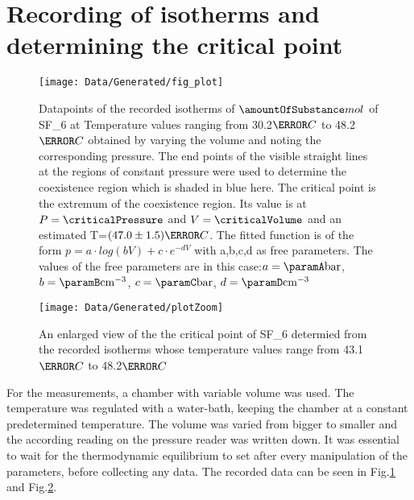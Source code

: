 \documentclass[a4paper,10pt,twocolumn]{article}
\begin{document}
    \section{Recording of isotherms and determining the critical point}
    \label{sec:Measurement}
    \begin{figure}
        \begin{center}
            \texttt{[image: Data/Generated/fig\_plot]}
            \caption[]{Datapoints of the recorded isotherms of $\amountOfSubstance mol$ of SF_6\) at Temperature values ranging from 30.2$\degree C$ to 48.2$\degree C$ obtained by varying the volume and noting the corresponding pressure. The end points of the visible straight lines at the regions of constant pressure were
            used to determine the coexistence region which is shaded in blue here. The critical point is the extremum of the coexistence region. Its value is at $P=\criticalPressure$ and $V=\criticalVolume$ and an estimated
            T=$(47.0\pm1.5)\degree C$.
            The fitted function is of the form $p = a \cdot log(bV) + c\cdot e^{-dV}$ with a,b,c,d as free parameters.
            The values of the free parameters are in this case:$a = \paramA \text{bar} $, $b = \paramB \text{cm}^{-3} $, $c = \paramC \text{bar}$, $d = \paramD \text{cm}^{-3}$}
            
            \label{binodal}
        \end{center}
    \end{figure}
    \begin{figure}
        \begin{center}
            \texttt{[image: Data/Generated/plotZoom]}
            \caption[]{An enlarged view of the the critical point of SF_6\) determied from the recorded isotherms whose temperature values range from 43.1$\degree C$ to 48.2$\degree C$}
            \label{ZoomedIn}
        \end{center}
    \end{figure}
    For the measurements, a chamber with variable volume was used.
    The temperature was regulated with a water-bath, keeping the chamber at a constant predetermined temperature.
    The volume was varied from bigger to smaller and the according reading on the pressure reader was written down.
    It was essential to wait for the thermodynamic equilibrium to set after every manipulation of the parameters, before collecting any data.
    The recorded data can be seen in Fig.\ref{binodal} and Fig.\ref{ZoomedIn}.
    
\end{document}
